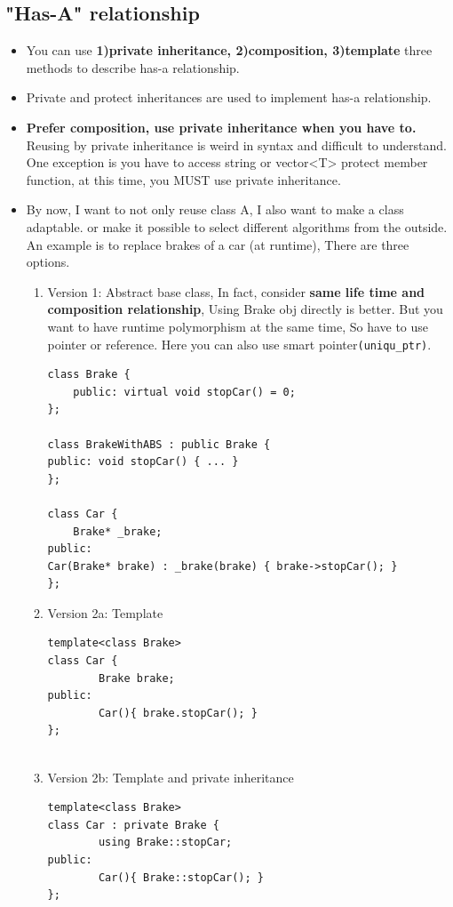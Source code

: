 \documentclass[a4paper,11pt,twoside]{book}
\begin{document}
\subsection{"Has-A" relationship}
\begin{itemize}
	\item You can use \textbf{1)private inheritance, 2)composition, 3)template} three methods to describe has-a relationship.
	
	\item Private and protect inheritances are used to implement has-a relationship. 

	\item \textbf{Prefer composition, use private inheritance when you have to.} Reusing by private inheritance is weird in syntax and difficult to understand. One exception is you have to access string or vector<T> protect member function, at this time, you MUST use private inheritance.
	
	\item By now, I want to not only reuse class A, I also want to make a class adaptable. or make it possible to select different algorithms from the outside.  An example is  to replace brakes of a car (at runtime), There are three options.
	\begin{enumerate}
		\item Version 1: Abstract base class, In fact, consider \textbf{same life time and composition relationship},  Using Brake obj directly is better. But you want to have runtime polymorphism at the same time, So have to use pointer or reference. Here you can also use smart pointer\texttt{(uniqu\_ptr)}.
\begin{lstlisting}[numbers=none]
class Brake {
	public: virtual void stopCar() = 0;
};
		
class BrakeWithABS : public Brake {
public: void stopCar() { ... }
};
		
class Car {
	Brake* _brake;
public:
Car(Brake* brake) : _brake(brake) { brake->stopCar(); }
};
\end{lstlisting}
		
		\item Version 2a: Template
		
\begin{lstlisting}[numbers=none]
template<class Brake>
class Car {
		Brake brake;
public:
		Car(){ brake.stopCar(); }
};
		
\end{lstlisting}
		\item Version 2b: Template and private inheritance
\begin{lstlisting}[numbers=none]
template<class Brake>
class Car : private Brake {
		using Brake::stopCar;
public:
		Car(){ Brake::stopCar(); }
};
\end{lstlisting}
	\end{enumerate}
	

\end{itemize}
\end{document}
